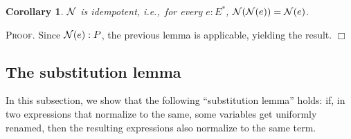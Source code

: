 \documentclass{article}
\newtheorem{corollary}[definition]{Corollary}
\newenvironment{proof}{\smallskip\textsc{Proof.}}{\hspace*{\fill}$\Box$}
\newcommand{\N}{{\cal N}}
\begin{document}
\begin{corollary}\label{NormRidemp} $\N$ is idempotent, i.e.,\ for every
$e:E^\ast$, $\N(\N(e))=\N(e)$.
\end{corollary}
\begin{proof}
Since $\N(e):P$, the previous lemma is applicable, yielding the result.
\end{proof}

\subsection{The substitution lemma}

In this subsection, we show that the following ``substitution lemma''
holds: if, in two expressions that normalize to the same, some variables
get uniformly renamed, then the resulting expressions also normalize to
the same term.
\end{document}
